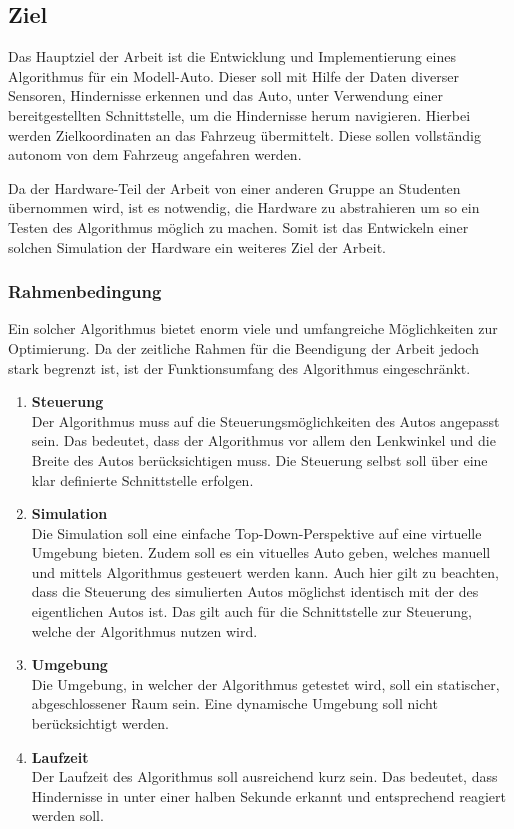 \subsection{Ziel}
Das Hauptziel der Arbeit ist die Entwicklung und Implementierung eines Algorithmus für ein Modell-Auto. Dieser soll mit Hilfe der Daten diverser Sensoren, Hindernisse
erkennen und das Auto, unter Verwendung einer bereitgestellten Schnittstelle, um die Hindernisse herum navigieren.
Hierbei werden Zielkoordinaten an das Fahrzeug übermittelt.
Diese sollen vollständig autonom von dem Fahrzeug angefahren werden.

Da der Hardware-Teil der Arbeit von einer anderen Gruppe an Studenten übernommen wird, ist es notwendig, die Hardware zu abstrahieren um so ein Testen des Algorithmus möglich zu machen. 
Somit ist das Entwickeln einer solchen Simulation der Hardware ein weiteres Ziel der Arbeit.

\subsubsection{Rahmenbedingung}
Ein solcher Algorithmus bietet enorm viele und umfangreiche Möglichkeiten zur Optimierung.
Da der zeitliche Rahmen für die Beendigung der Arbeit jedoch stark begrenzt ist, ist der Funktionsumfang des Algorithmus eingeschränkt.
\begin{enumerate}[leftmargin=*]
    \item \textbf{Steuerung} \\
    Der Algorithmus muss auf die Steuerungsmöglichkeiten des Autos ange\-passt sein.
    Das bedeutet, dass der Algorithmus vor allem den Lenkwin\-kel und die Breite des Autos berücksichtigen muss.
    Die Steuerung selbst soll über eine klar definierte Schnittstelle erfolgen.

    \item \textbf{Simulation} \\
    Die Simulation soll eine einfache Top-Down-Perspektive auf eine virtu\-elle Umgebung bieten.
    Zudem soll es ein vituelles Auto geben, welches manuell und mittels Algorithmus gesteuert werden kann.
    Auch hier gilt zu beachten, dass die Steuerung des simulierten Autos möglichst identisch mit der des eigentlichen Autos ist.
    Das gilt auch für die Schnittstelle zur Steuerung, welche der Algorithmus nutzen wird.

    \item \textbf{Umgebung} \\
    Die Umgebung, in welcher der Algorithmus getestet wird, soll ein statischer, abgeschlossener Raum sein.
    Eine dynamische Umgebung soll nicht berücksichtigt werden.

    \item \textbf{Laufzeit} \\
    Der Laufzeit des Algorithmus soll ausreichend kurz sein.
    Das bedeutet, dass Hindernisse in unter einer halben Sekunde erkannt und entsprech\-end reagiert werden soll.
\end{enumerate}


